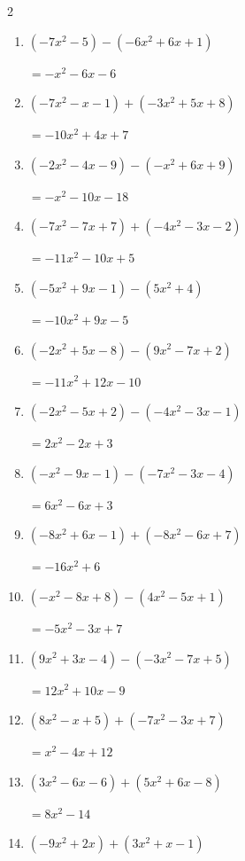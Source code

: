 \begin{multicols}{2}
\begin{enumerate}
  \item $(-7x^{2}-5)-(-6x^{2}+6x+1)$

        $=-x^{2}-6x-6$

  \item $(-7x^{2}-x-1)+(-3x^{2}+5x+8)$

        $=-10x^{2}+4x+7$

  \item $(-2x^{2}-4x-9)-(-x^{2}+6x+9)$

        $=-x^{2}-10x-18$

  \item $(-7x^{2}-7x+7)+(-4x^{2}-3x-2)$

        $=-11x^{2}-10x+5$

  \item $(-5x^{2}+9x-1)-(5x^{2}+4)$

        $=-10x^{2}+9x-5$

  \item $(-2x^{2}+5x-8)-(9x^{2}-7x+2)$

        $=-11x^{2}+12x-10$

  \item $(-2x^{2}-5x+2)-(-4x^{2}-3x-1)$

        $=2x^{2}-2x+3$

  \item $(-x^{2}-9x-1)-(-7x^{2}-3x-4)$

        $=6x^{2}-6x+3$

\columnbreak %

\resetques

  \item $(-8x^{2}+6x-1)+(-8x^{2}-6x+7)$

        $=-16x^{2}+6$

  \item $(-x^{2}-8x+8)-(4x^{2}-5x+1)$

        $=-5x^{2}-3x+7$

  \item $(9x^{2}+3x-4)-(-3x^{2}-7x+5)$

        $=12x^{2}+10x-9$

  \item $(8x^{2}-x+5)+(-7x^{2}-3x+7)$

        $=x^{2}-4x+12$

  \item $(3x^{2}-6x-6)+(5x^{2}+6x-8)$

        $=8x^{2}-14$

  \item $(-9x^{2}+2x)+(3x^{2}+x-1)$


\end{enumerate}
\end{multicols}
